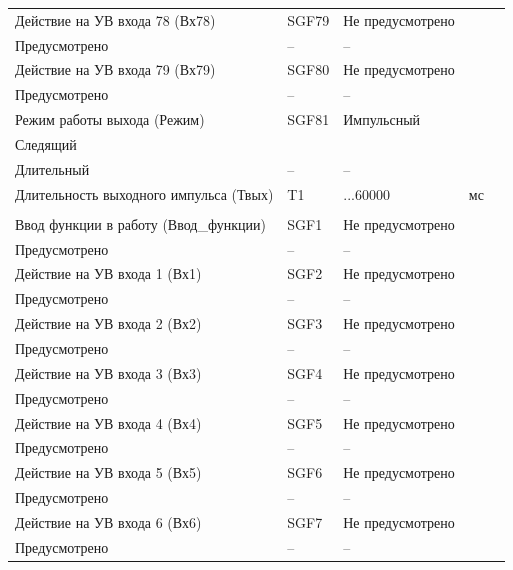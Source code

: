 \begin{longtable}{|>{\centering\arraybackslash}m{5.3cm}|>{\centering\arraybackslash}m{3.3cm}|>{\centering\arraybackslash}m{4.2cm}|>{\centering\arraybackslash}m{1.8cm}|>{\centering\arraybackslash}m{1cm}|}
\hline
\centering Действие на УВ входа 78 (Вх78)  & \centering SGF79 & \centering Не предусмотрено \\ Предусмотрено & \centering -- & \centering \arraybackslash -- \\
\hline
\centering Действие на УВ входа 79 (Вх79)  & \centering SGF80 & \centering Не предусмотрено \\ Предусмотрено & \centering -- & \centering \arraybackslash -- \\
\hline
\centering Режим работы выхода (Режим)  & \centering SGF81 & \centering Импульсный \\ Следящий \\ Длительный & \centering -- & \centering \arraybackslash -- \\
\hline
\centering Длительность выходного импульса (Твых)  & \centering T1 & \centering 50...60000 & \centering мс & \centering \arraybackslash 10 \\
\hline
\multicolumn{5}{|c|}{ УВ3 } \\ \hline 
\centering Ввод функции в работу (Ввод\_функции)  & \centering SGF1 & \centering Не предусмотрено \\ Предусмотрено & \centering -- & \centering \arraybackslash -- \\
\hline
\centering Действие на УВ входа 1 (Вх1)  & \centering SGF2 & \centering Не предусмотрено \\ Предусмотрено & \centering -- & \centering \arraybackslash -- \\
\hline
\centering Действие на УВ входа 2 (Вх2)  & \centering SGF3 & \centering Не предусмотрено \\ Предусмотрено & \centering -- & \centering \arraybackslash -- \\
\hline
\centering Действие на УВ входа 3 (Вх3)  & \centering SGF4 & \centering Не предусмотрено \\ Предусмотрено & \centering -- & \centering \arraybackslash -- \\
\hline
\centering Действие на УВ входа 4 (Вх4)  & \centering SGF5 & \centering Не предусмотрено \\ Предусмотрено & \centering -- & \centering \arraybackslash -- \\
\hline
\centering Действие на УВ входа 5 (Вх5)  & \centering SGF6 & \centering Не предусмотрено \\ Предусмотрено & \centering -- & \centering \arraybackslash -- \\
\hline
\centering Действие на УВ входа 6 (Вх6)  & \centering SGF7 & \centering Не предусмотрено \\ Предусмотрено & \centering -- & \centering \arraybackslash -- \\

\end{longtable}
